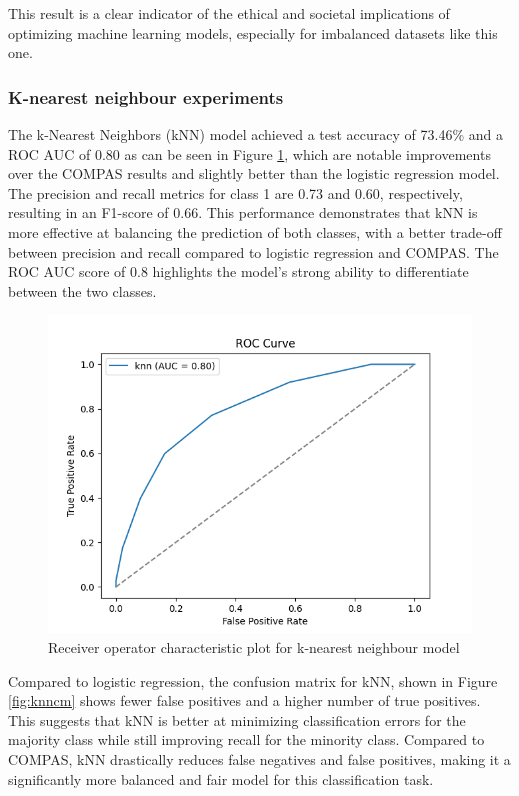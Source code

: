 This result is a clear indicator of the ethical and societal implications of optimizing machine learning models, especially for imbalanced datasets like this one.



\bigskip
\subsubsection{K-nearest neighbour experiments}

The k-Nearest Neighbors (kNN) model achieved a test accuracy of 73.46\% and a ROC AUC of 0.80 as can be seen in Figure \ref{fig:knnroc}, which are notable improvements over the COMPAS results and slightly better than the logistic regression model. The precision and recall metrics for class 1 are 0.73 and 0.60, respectively, resulting in an F1-score of 0.66. This performance demonstrates that kNN is more effective at balancing the prediction of both classes, with a better trade-off between precision and recall compared to logistic regression and COMPAS. The ROC AUC score of 0.8 highlights the model’s strong ability to differentiate between the two classes.

\begin{figure}[H]
	\centering
	\includegraphics[width=0.7\linewidth]{img/knn_roc}
	\caption{Receiver operator characteristic plot for k-nearest neighbour model}
	\label{fig:knnroc}
\end{figure}

Compared to logistic regression, the confusion matrix for kNN, shown in Figure \ref{fig:knncm} shows fewer false positives and a higher number of true positives. This suggests that kNN is better at minimizing classification errors for the majority class while still improving recall for the minority class. Compared to COMPAS, kNN drastically reduces false negatives and false positives, making it a significantly more balanced and fair model for this classification task.

